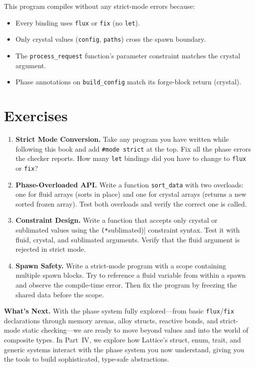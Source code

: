 This program compiles without any strict-mode errors because:
\begin{itemize}
  \item Every binding uses \lstinline|flux| or \lstinline|fix| (no \lstinline|let|).
  \item Only crystal values (\lstinline|config|, \lstinline|paths|) cross the spawn boundary.
  \item The \lstinline|process_request| function's parameter constraint matches the crystal argument.
  \item Phase annotations on \lstinline|build_config| match its forge-block return (crystal).
\end{itemize}

\section{Exercises}\label{sec:ch14-exercises}

\begin{enumerate}
  \item \textbf{Strict Mode Conversion.}
    Take any program you have written while following this book and add \lstinline|#mode strict| at the top.
    Fix all the phase errors the checker reports.
    How many \lstinline|let| bindings did you have to change to \lstinline|flux| or \lstinline|fix|?

  \item \textbf{Phase-Overloaded API.}
    Write a function \lstinline|sort_data| with two overloads: one for fluid arrays (sorts in place) and one for crystal arrays (returns a new sorted frozen array).
    Test both overloads and verify the correct one is called.

  \item \textbf{Constraint Design.}
    Write a function that accepts only crystal or sublimated values using the \lstinline|(*|sublimated)| constraint syntax.
    Test it with fluid, crystal, and sublimated arguments.
    Verify that the fluid argument is rejected in strict mode.

  \item \textbf{Spawn Safety.}
    Write a strict-mode program with a scope containing multiple spawn blocks.
    Try to reference a fluid variable from within a spawn and observe the compile-time error.
    Then fix the program by freezing the shared data before the scope.
\end{enumerate}

\bigskip

\noindent\textbf{What's Next.}\quad
With the phase system fully explored---from basic \lstinline|flux|/\lstinline|fix| declarations through memory arenas, alloy structs, reactive bonds, and strict-mode static checking---we are ready to move beyond values and into the world of composite types.
In Part~IV, we explore how Lattice's struct, enum, trait, and generic systems interact with the phase system you now understand, giving you the tools to build sophisticated, type-safe abstractions.

